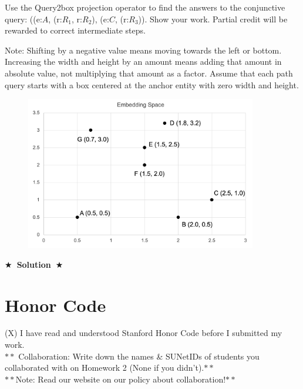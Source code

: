 \documentclass{article}
\newcommand{\Solution}[1]{{\medskip \color{black} \bf $\bigstar$~\sf \textbf{Solution}~$\bigstar$ \sf #1 } \bigskip}
\begin{document}
Use the Query2box projection operator to find the answers to the conjunctive query: ((e:$A$, (r:$R_1$, r:$R_2$), (e:$C$, (r:$R_3$)). Show your work. Partial credit will be rewarded to correct intermediate steps.

Note: Shifting by a negative value means moving towards the left or bottom. Increasing the width and height by an amount means adding that amount in absolute value, not multiplying that amount as a factor. Assume that each path query starts with a box centered at the anchor entity with zero width and height.

\begin{figure}[H]
    \centering
    \includegraphics[width=0.9\textwidth]{query2box.png}
    \label{fig:5.4}
\end{figure}

\Solution{}


\section{Honor Code}
(X) I have read and understood Stanford Honor Code before I submitted my work.
\\ $**$ Collaboration: Write down the names \& SUNetIDs of students you collaborated with on Homework 2 (None if you didn’t).$**$
\\ $**$Note: Read our website on our policy about collaboration!$**$
\end{document}
